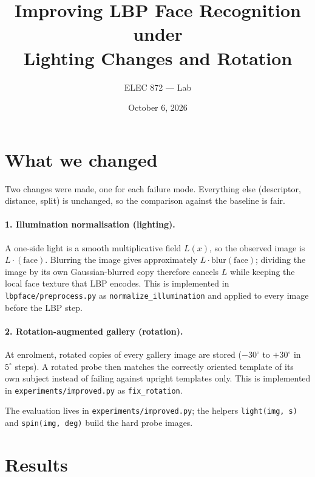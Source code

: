 \documentclass[11pt]{article}
\title{Improving LBP Face Recognition under\\ Lighting Changes and Rotation}
\author{ELEC 872 --- Lab}
\date{October 6, 2026}
\begin{document}
\maketitle

\section{What we changed}

Two changes were made, one for each failure mode. Everything else (descriptor,
distance, split) is unchanged, so the comparison against the baseline is fair.

\paragraph{1. Illumination normalisation (lighting).}
A one-side light is a smooth multiplicative field $L(x)$, so the observed image is
$L\cdot(\text{face})$. Blurring the image gives approximately
$L\cdot\text{blur}(\text{face})$; dividing the image by its own Gaussian-blurred copy
therefore cancels $L$ while keeping the local face texture that LBP encodes. This is
implemented in \texttt{lbpface/preprocess.py} as \texttt{normalize\_illumination} and
applied to every image before the LBP step.

\paragraph{2. Rotation-augmented gallery (rotation).}
At enrolment, rotated copies of every gallery image are stored ($-30^\circ$ to
$+30^\circ$ in $5^\circ$ steps). A rotated probe then matches the correctly oriented
template of its own subject instead of failing against upright templates only. This is
implemented in \texttt{experiments/improved.py} as \texttt{fix\_rotation}.

The evaluation lives in \texttt{experiments/improved.py}; the helpers
\texttt{light(img, s)} and \texttt{spin(img, deg)} build the hard probe images.

\section{Results}
\end{document}
